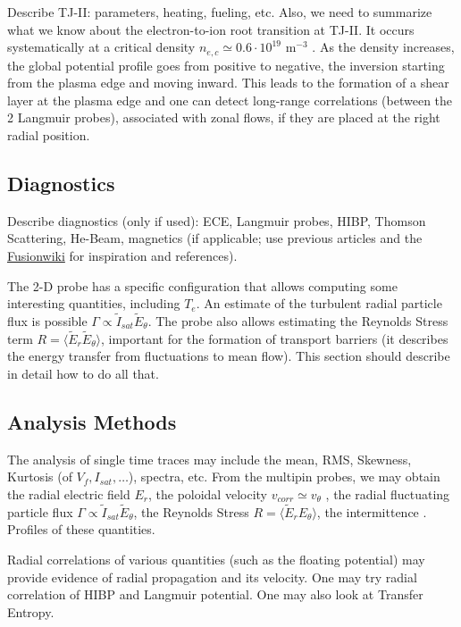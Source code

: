 \documentclass[preprint,12pt,authoryear]{elsarticle}
\begin{document}
Describe TJ-II: parameters, heating, fueling, etc. Also, we need to summarize what we know about the electron-to-ion root transition at TJ-II. 
It occurs systematically at a critical density $n_{e,c} \simeq 0.6 \cdot 10^{19}$ m$^{-3}$
\cite{Hidalgo:2006b} \cite{Pedrosa:2008}.
As the density increases, the global potential profile goes from positive to negative, the inversion starting from the plasma edge and moving inward. This leads to the formation of a shear layer at the plasma edge and one can detect long-range correlations (between the 2 Langmuir probes), associated with zonal flows, if they are placed at the right radial position.

\subsection{Diagnostics}

Describe diagnostics (only if used): ECE, Langmuir probes, HIBP, Thomson Scattering, He-Beam, magnetics (if applicable; use previous articles and the \href{https://wiki.fusion.ciemat.es/wiki/TJ-II}{Fusionwiki} for inspiration and references).

The 2-D probe has a specific configuration that allows computing some interesting quantities, including $T_e$.
An estimate of the turbulent radial particle flux is possible $\Gamma \propto \tilde I_{sat} \tilde E_\theta$.
The probe also allows estimating the Reynolds Stress term $R = \langle \tilde E_r \tilde E_\theta \rangle$, important for the formation of transport barriers (it describes the energy transfer from fluctuations to mean flow).
This section should describe in detail how to do all that.

\subsection{Analysis Methods}

The analysis of single time traces may include the mean, RMS, Skewness, Kurtosis (of $V_f, I_{sat}, \dots$), spectra, etc. From the multipin probes, we may obtain the radial electric field $E_r$, the poloidal velocity $v_{corr} \simeq v_\theta$ \cite{Milligen:2023b}, the radial fluctuating particle flux $\Gamma \propto \tilde I_{sat} \tilde E_\theta$, the Reynolds Stress $R = \langle \tilde E_r E_\theta \rangle$, the intermittence \cite{Carreras:2020}. Profiles of these quantities. 

Radial correlations of various quantities (such as the floating potential) may provide evidence of radial propagation and its velocity. One may try radial correlation of HIBP and Langmuir potential. One may also look at Transfer Entropy.
\end{document}

